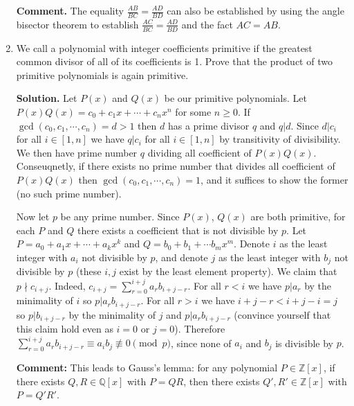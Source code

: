 \documentclass[11pt]{article}
\begin{document}
\begin{enumerate}
\textbf {Comment.} The equality $\frac{AB}{BC}=\frac{AD}{BD}$ can also be established by using the angle bisector theorem to establish $\frac{AC}{BC}=\frac{AD}{BD}$ and the fact $AC=AB$.

\item We call a polynomial with integer coefficients primitive if the greatest common divisor of all of its coefficients is 1. Prove that the product of two primitive polynomials is again primitive.

\textbf{Solution.} Let $P(x)$ and $Q(x)$ be our primitive polynomials. Let $P(x)Q(x)=c_0+c_1x+\cdots +c_n x^n$ for some $n\ge 0$. If $\gcd (c_0, c_1, \cdots ,c_n)=d>1$ then $d$ has a prime divisor $q$ and $q|d$. Since $d|c_i$ for all $i\in [1,n]$ we have $q|c_i$ for all $i\in [1,n]$ by transitivity of divisibility. We then have prime number $q$ dividing all coefficient of $P(x)Q(x)$. Conseuqnetly, if there exists no prime number that divides all coefficient of $P(x)Q(x)$ then $\gcd (c_0, c_1, \cdots ,c_n)=1$, and it suffices to show the former (no such prime number).

Now let $p$ be any prime number. Since $P(x)$, $Q(x)$ are both primitive, for each $P$ and $Q$ there exists a coefficient that is not divisible by $p$. Let $P=a_0+a_1x+\cdots + a_kx^k$ and $Q=b_0+b_1+\cdots b_mx^m$. Denote $i$ as the least integer with $a_i$ not divisible by $p$, and denote $j$ as the least integer with $b_j$ not divisible by $p$ (these $i, j$ exist by the least element property). We claim that $p\nmid c_{i+j}$. Indeed, $c_{i+j}=\displaystyle\sum_{r=0}^{i+j} a_rb_{i+j-r}$. For all $r< i$ we have $p|a_r$ by the minimality of $i$ so $p|a_rb_{i+j-r}$. For all $r>i$ we have $i+j-r<i+j-i=j$ so $p|b_{i+j-r}$ by the minimality of $j$ and $p|a_rb_{i+j-r}$ (convince yourself that this claim hold even as $i=0$ or $j=0$). Therefore $\displaystyle\sum_{r=0}^{i+j} a_rb_{i+j-r}\equiv a_ib_j\not\equiv 0\pmod{p}$, since none of $a_i$ and $b_j$ is divisible by $p$.

\textbf{Comment:} This leads to Gauss's lemma: for any polynomial $P\in\mathbb{Z}[x]$, if there exists $Q,R\in\mathbb{Q}[x]$ with $P=QR$, then there exists $Q', R'\in\mathbb{Z}[x]$ with $P=Q'R'$.
\end{enumerate}
\end{document}
